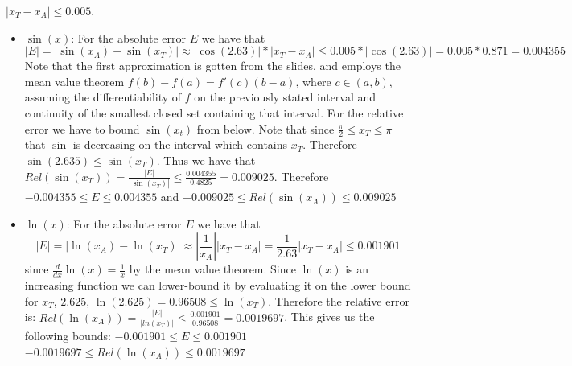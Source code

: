 \documentclass[12pt, letterpaper]{article}
\begin{document}
\begin{enumerate}
	$|x_T - x_A| \leq 0.005$.
	\begin{itemize}
		\item $\sin(x)$: For the absolute error $E$ we have that $$|E| = |\sin(x_A) - \sin(x_T)| \approx |\cos(2.63)|*|x_T - x_A| \leq  0.005*|\cos(2.63)| = 0.005*0.871 = 0.004355$$
		Note that the first approximation is gotten from the slides, and employs the mean value theorem $f(b) - f(a) = f'(c)(b-a)$, where
		$c \in (a,b)$, assuming the differentiability of $f$ on the previously stated interval and continuity of the smallest closed set 
		containing that interval.
		For the relative error we have to bound $\sin(x_t)$ from below.  Note that since $\frac{\pi}{2} \leq x_T \leq \pi$ that $\sin$ is decreasing on the interval which contains $x_T$.  Therefore $\sin(2.635) \leq \sin(x_T)$.  Thus 
		we have that $Rel(\sin(x_T)) = \frac{|E|}{|\sin(x_T)|} \leq \frac{0.004355}{0.4825} = 0.009025$.
		Therefore $-0.004355 \leq E \leq 0.004355$ and $-0.009025 \leq Rel(\sin(x_A)) \leq 0.009025$
		\item $\ln(x)$: For the absolute error $E$ we have that 
		$$
		|E| = |\ln(x_A) - \ln(x_T)| \approx |\frac{1}{x_A}||x_T - x_A| = \frac{1}{2.63}|x_T - x_A| \leq 0.001901
		$$
		since $\frac{d}{dx}\ln(x) = \frac{1}{x}$ by the mean value theorem.
		Since $\ln(x)$ is an increasing function we can lower-bound it by evaluating it on the lower bound for $x_T$, 
		$2.625$, $\ln(2.625) = 0.96508 \leq \ln(x_T)$.  Therefore the relative error is:
		$Rel(\ln(x_A)) = \frac{|E|}{|ln(x_T)|} \leq \frac{0.001901}{0.96508} = 0.0019697$.
		This gives us the following bounds:
		$-0.001901 \leq E \leq 0.001901$\\
		$-0.0019697 \leq Rel(\ln(x_A)) \leq 0.0019697$
	\end{itemize}
\end{enumerate}
\end{document}
